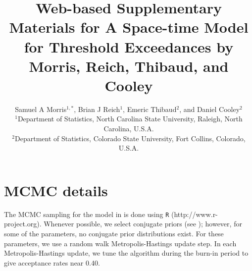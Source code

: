 \documentclass[useAMS,usenatbib,referee]{biomweb}
\title[Web-based Supplementary Materials for A Space-time \Skewt Model for Threshold Exceedances]{Web-based Supplementary Materials for A Space-time \Skewt Model for Threshold Exceedances by Morris, Reich, Thibaud, and Cooley}
\author
{Samuel A Morris$^{1,*}$\email{samorris@ncsu.edu},
Brian J Reich$^{1}$,
Emeric Thibaud$^{2}$, and
Daniel Cooley$^{2}$\\
$^{1}$Department of Statistics, North Carolina State University, Raleigh, North Carolina, U.S.A. \\
$^{2}$Department of Statistics, Colorado State University, Fort Collins, Colorado, U.S.A.}
\begin{document}
\maketitle



\renewcommand{\thesection}{Web Appendix~\Alph{section}}

\section{MCMC details} \label{sta:mcmc}
The MCMC sampling for the model in  is done using {\tt R} (http://www.r-project.org). Whenever possible, we select conjugate priors (see ); however, for some of the parameters, no conjugate prior distributions exist.
For these parameters, we use a random walk Metropolis-Hastings update step.
In each Metropolis-Hastings update, we tune the algorithm during the burn-in period to give acceptance rates near 0.40.
\end{document}
